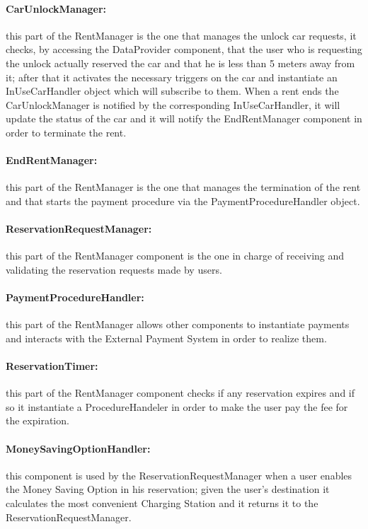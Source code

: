 \paragraph{CarUnlockManager:} this part of the RentManager is the one that manages the unlock car requests, it checks, by accessing the DataProvider component, that the user who is requesting the unlock actually reserved the car and that he is less than 5 meters away from it; after that it activates the necessary triggers on the car and instantiate an InUseCarHandler object which will subscribe to them. When a rent ends the CarUnlockManager is notified by the corresponding InUseCarHandler, it will update the status of the car and it will notify the EndRentManager component in order to terminate the rent.
\paragraph{EndRentManager:} this part of the RentManager is the one that manages the termination of the rent and that starts the payment procedure via the \mbox{PaymentProcedureHandler} object.
\paragraph{ReservationRequestManager:} this part of the RentManager component is the one in charge of receiving and validating the reservation requests made by users.
\paragraph{PaymentProcedureHandler:} this part of the RentManager allows other components to instantiate payments and interacts with the External Payment System in order to realize them.
\paragraph{ReservationTimer:} this part of the RentManager component checks if any reservation expires and if so it instantiate a ProcedureHandeler in order to make the user pay the fee for the expiration.
\paragraph{MoneySavingOptionHandler:} this component is used by the ReservationRequestManager when a user enables the Money Saving Option in his reservation; given the user's destination it calculates the most convenient Charging Station and it returns it to the ReservationRequestManager.
